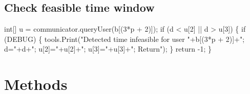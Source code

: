\subsection{Check feasible time window}
\nwenddocs{}\endmoddef\nwstartdeflinemarkup{}\nwenddeflinemarkup
int[] u = communicator.queryUser(b[(3*p + 2)]);
if (d < u[2] || d > u[3]) \{
  if (DEBUG) \{
    tools.Print("Detected time infeasible for user "+b[(3*p + 2)]+"; d="+d+"; u[2]="+u[2]+"; u[3]="+u[3]+"; Return");
  \}
  return -1;
\}
\nwendcode{}\nwdocspar


\section{Methods}

